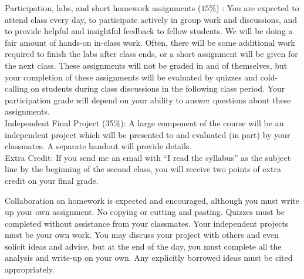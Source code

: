 \documentclass[10pt]{article}
\begin{document}
\noindent Participation, labs, and short homework assignments ($15\%$) :
You are expected to attend class every day, to participate actively in group work and discussions, and to provide helpful and insightful feedback to fellow students. We will be doing a fair amount of hands-on in-class work. Often, there will be some additional work required to finish the labs after class ends, or a short assignment will be given for the next class. These assignments will not be graded in and of themselves, but your completion of these assignments will be evaluated by quizzes and cold-calling on students during class discussions in the following class period. Your participation grade will depend on your ability to answer questions about these assignments. \\


\noindent Independent Final Project (35\%): A large component of the course will be an independent project which will be presented to and evaluated (in part) by your classmates. A separate handout will provide details. \\


\noindent Extra Credit: If you send me an email with ``I read the syllabus'' as the subject line by the beginning of the second class, you will receive two points of extra credit on your final grade.

\bigskip
{}

Collaboration on homework is expected and encouraged, although you must write up your own assignment. No copying or cutting and pasting. Quizzes must be completed without assistance from your classmates. Your independent projects must be your own work. You may discuss your project with others and even solicit ideas and advice, but at the end of the day, you must complete all the analysis and write-up on your own. Any explicitly borrowed ideas must be cited appropriately.
\end{document}
